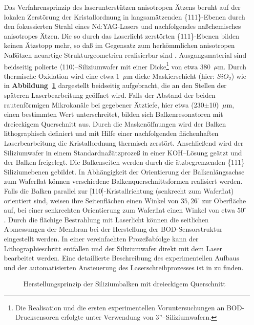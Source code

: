 Das Verfahrensprinzip des laserunterstützen anisotropen Ätzens beruht auf
der lokalen Zerstörung der Kristallordnung in langsamätzenden
\{111\}-Ebenen durch den fokussierten Strahl eines Nd:YAG-Lasers
und nachfolgendes naßchemisches anisotropes Ätzen.
Die so durch das Laserlicht zerstörten \{111\}-Ebenen bilden keinen
Ätzstopp mehr, so daß im Gegensatz zum herkömmlichen anisotropen Naßätzen
neuartige Strukturgeometrien realisierbar sind \cite{Ala92a}.
Ausgangsmaterial sind beidseitig polierte
$\langle$110$\rangle$--Siliziumwafer mit einer Dicke\footnote{Die
Realisation und die ersten experimentellen Voruntersuchungen an
BOD-Drucksensoren erfolgte unter Verwendung von 3''--Siliziumwafern.}
von etwa 380~$\mu$m. Durch
thermische Oxidation wird eine etwa 1~$\mu$m dicke Maskierschicht
(hier: $SiO_{2}$) wie in {\bf Abbildung~\ref{abbbodprinzip}}
dargestellt beidseitig aufgebracht, die an den Stellen der späteren
Laserbearbeitung geöffnet wird. Falls der Abstand der beiden rautenförmigen
Mikrokanäle bei gegebener Ätztiefe, hier etwa (230$\pm$10)~$\mu$m, einen
bestimmten Wert unterschreitet, bilden sich Balkenresonatoren mit
dreieckigem Querschnitt aus. Durch die Maskenöffnungen wird der Balken
lithographisch definiert und mit Hilfe einer nachfolgenden flächenhaften
Laserbearbeitung die Kristallordnung thermisch zerstört. Anschließend
wird der Siliziumwafer in einem Standardnaßätzprozeß in einer KOH--Lösung
geätzt und der Balken freigelegt. Die Balkenseiten
werden durch die ätzbegrenzenden \{111\}--Siliziumebenen gebildet. In
Abhängigkeit der Orientierung der Balkenlängsachse zum Waferflat können
verschiedene Balkenquerschnittsformen realisiert werden. Falls die Balken
parallel zur [110]-Kristallrichtung (senkrecht zum Waferflat) orientiert
sind, weisen ihre Seitenflächen einen Winkel von $35,26^{\circ}$ zur
Oberfläche auf, bei einer senkrechten
Orientierung zum Waferflat einen Winkel von etwa $50^{\circ}$ \cite{Ala92b}.
Durch die flächige Bestrahlung mit Laserlicht können die seitlichen
Abmessungen der Membran bei der Herstellung der BOD-Sensorstruktur
eingestellt werden.
In einer vereinfachten Prozeßabfolge kann der Lithographieschritt
entfallen und der Siliziumwafer direkt mit dem Laser bearbeitet werden.
Eine detaillierte Beschreibung des experimentellen Aufbaus und der
automatisierten Ansteuerung des Laserschreibprozesses ist in
\cite{Dissaxel} zu finden.\\
\begin{figure}[htb]

\begin{center}

\setabbsse
\end{center}
\caption{\label{abbbodprinzip}
 Herstellungsprinzip der Siliziumbalken mit dreieckigem Querschnitt}
\end{figure}
